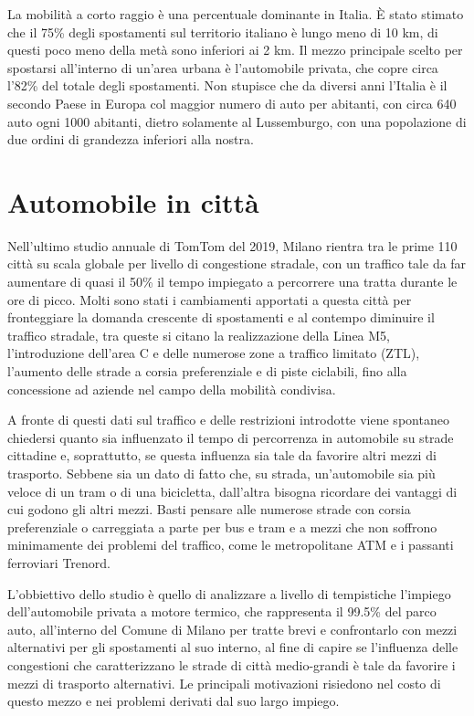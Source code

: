 La mobilità a corto raggio è una percentuale dominante in Italia. È stato stimato che il 75\% degli spostamenti sul territorio italiano è lungo meno di 10 km, di questi poco meno della metà sono inferiori ai 2 km\cite{isfortaudimob}. Il mezzo principale scelto per spostarsi all'interno di un'area urbana è l'automobile privata, che copre circa l'82\% del totale degli spostamenti. Non stupisce che da diversi anni l'Italia è il secondo Paese in Europa col maggior numero di auto per abitanti, con circa 640 auto ogni 1000 abitanti\cite{eurostatcars}, dietro solamente al Lussemburgo, con una popolazione di due ordini di grandezza inferiori alla nostra.

\section{Automobile in città}

Nell'ultimo studio annuale di TomTom del 2019, Milano rientra tra le prime 110 città su scala globale per livello di congestione stradale, con un traffico tale da far aumentare di quasi il 50\% il tempo impiegato a percorrere una tratta durante le ore di picco\cite{tomtomindexmilan}. Molti sono stati i cambiamenti apportati a questa città per fronteggiare la domanda crescente di spostamenti e al contempo diminuire il traffico stradale, tra queste si citano la realizzazione della Linea M5, l'introduzione dell'area C e delle numerose zone a traffico limitato (ZTL), l'aumento delle strade a corsia preferenziale e di piste ciclabili, fino alla concessione ad aziende nel campo della mobilità condivisa.

A fronte di questi dati sul traffico e delle restrizioni introdotte viene spontaneo chiedersi quanto sia influenzato il tempo di percorrenza in automobile su strade cittadine e, soprattutto, se questa influenza sia tale da favorire altri mezzi di trasporto. Sebbene sia un dato di fatto che, su strada, un'automobile sia più veloce di un tram o di una bicicletta, dall'altra bisogna ricordare dei vantaggi di cui godono gli altri mezzi. Basti pensare alle numerose strade con corsia preferenziale o carreggiata a parte per bus e tram e a mezzi che non soffrono minimamente dei problemi del traffico, come le metropolitane ATM e i passanti ferroviari Trenord.

L'obbiettivo dello studio è quello di analizzare a livello di tempistiche l'impiego dell'automobile privata a motore termico, che rappresenta il 99.5\% del parco auto\cite{anfiastudiestatistiche}, all'interno del Comune di Milano per tratte brevi e confrontarlo con mezzi alternativi per gli spostamenti al suo interno, al fine di capire se l'influenza delle congestioni che caratterizzano le strade di città medio-grandi è tale da favorire i mezzi di trasporto alternativi. Le principali motivazioni risiedono nel costo di questo mezzo e nei problemi derivati dal suo largo impiego.

